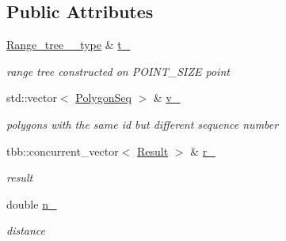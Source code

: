 \subsection*{Public Attributes}
\begin{DoxyCompactItemize}
\item 
\hypertarget{structSigSpatial2013_1_1within__n_a233b38ad524ac2e88ca3c7af8bbb6ee7}{\hyperlink{namespaceSigSpatial2013_a1f24a632c09e5f10b138ef0096857e43}{Range\-\_\-tree\-\_\-\_\-type} \& \hyperlink{structSigSpatial2013_1_1within__n_a233b38ad524ac2e88ca3c7af8bbb6ee7}{t\-\_\-}}\label{structSigSpatial2013_1_1within__n_a233b38ad524ac2e88ca3c7af8bbb6ee7}

\begin{DoxyCompactList}\small\item\em range tree constructed on P\-O\-I\-N\-T\-\_\-\-S\-I\-Z\-E point \end{DoxyCompactList}\item 
\hypertarget{structSigSpatial2013_1_1within__n_a6f04a4fd6f5a228294cb213668ec4f6d}{std\-::vector$<$ \hyperlink{structSigSpatial2013_1_1PolygonSeq}{Polygon\-Seq} $>$ \& \hyperlink{structSigSpatial2013_1_1within__n_a6f04a4fd6f5a228294cb213668ec4f6d}{v\-\_\-}}\label{structSigSpatial2013_1_1within__n_a6f04a4fd6f5a228294cb213668ec4f6d}

\begin{DoxyCompactList}\small\item\em polygons with the same id but different sequence number \end{DoxyCompactList}\item 
\hypertarget{structSigSpatial2013_1_1within__n_a7f5003bec01e527b3e76291a98fe3919}{tbb\-::concurrent\-\_\-vector$<$ \hyperlink{namespaceSigSpatial2013_af3568b84c52aee7ab5aa8f15fb019d7f}{Result} $>$ \& \hyperlink{structSigSpatial2013_1_1within__n_a7f5003bec01e527b3e76291a98fe3919}{r\-\_\-}}\label{structSigSpatial2013_1_1within__n_a7f5003bec01e527b3e76291a98fe3919}

\begin{DoxyCompactList}\small\item\em result \end{DoxyCompactList}\item 
\hypertarget{structSigSpatial2013_1_1within__n_aba7117da29bbd059bd15eebee8fdddb8}{double \hyperlink{structSigSpatial2013_1_1within__n_aba7117da29bbd059bd15eebee8fdddb8}{n\-\_\-}}\label{structSigSpatial2013_1_1within__n_aba7117da29bbd059bd15eebee8fdddb8}

\begin{DoxyCompactList}\small\item\em distance \end{DoxyCompactList}\end{DoxyCompactItemize}


